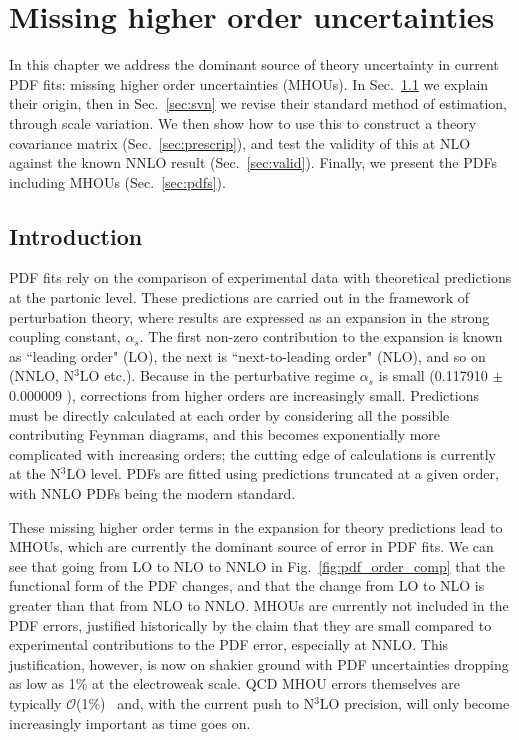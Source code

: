 \chapter{Missing higher order uncertainties}
\label{chapter:mhous}
In this chapter we address the dominant source of theory uncertainty in current PDF fits: missing higher order uncertainties (MHOUs). In Sec.~\ref{sec:intro} we explain their origin, then in Sec.~\ref{sec:svn} we revise their standard method of estimation, through scale variation. We then show how to use this to construct a theory covariance matrix (Sec.~\ref{sec:prescrip}), and test the validity of this at NLO against the known NNLO result (Sec.~\ref{sec:valid}). Finally, we present the PDFs including MHOUs (Sec.~\ref{sec:pdfs}).

\section{Introduction}
\label{sec:intro}
PDF fits rely on the comparison of experimental data with theoretical predictions at the partonic level. These predictions are carried out in the framework of perturbation theory, where results are expressed as an expansion in the strong coupling constant, $\alpha_s$. The first non-zero contribution to the expansion is known as ``leading order" (LO), the next is ``next-to-leading order" (NLO), and so on (NNLO, N$^3$LO etc.). Because in the perturbative regime $\alpha_s$ is small (0.117910 $\pm$ 0.000009 \cite{pdg}), corrections from higher orders are increasingly small. Predictions must be directly calculated at each order by considering all the possible contributing Feynman diagrams, and this becomes exponentially more complicated with increasing orders; the cutting edge of calculations is currently at the N$^3$LO level. PDFs are fitted using predictions truncated at a given order, with NNLO PDFs being the modern standard. 

These missing higher order terms in the expansion for theory predictions lead to MHOUs, which are currently the dominant source of error in PDF fits. We can see that going from LO to NLO to NNLO in Fig.~\ref{fig:pdf_order_comp} that the functional form of the PDF changes, and that the change from LO to NLO is greater than that from NLO to NNLO. MHOUs are currently not included in the PDF errors, justified historically by the claim that they are small compared to experimental contributions to the PDF error, especially at NNLO. This justification, however, is now on shakier ground with PDF uncertainties dropping as low as 1\% at the electroweak scale. QCD MHOU errors themselves are typically $\mathcal{O}$(1\%)~\cite{Campbell:2017hsr} and, with the current push to N$^3$LO precision, will only become increasingly important as time goes on. 


